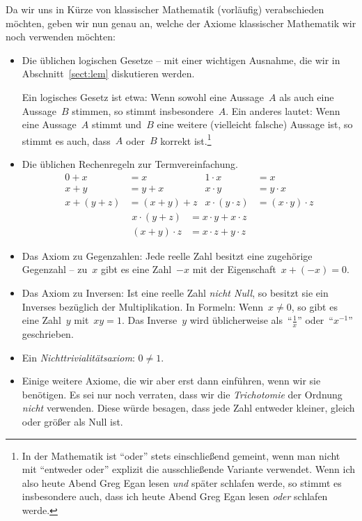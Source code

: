 \documentclass[twoside]{../zirkelblatt}
\theoremstyle{definition}
\theoremstyle{plain}
\theoremstyle{remark}
\begin{document}
Da wir uns in Kürze von klassischer Mathematik (vorläufig) verabschieden
möchten, geben wir nun genau an, welche der Axiome klassischer Mathematik wir
noch verwenden möchten:
\begin{itemize}
\item Die üblichen logischen Gesetze -- mit einer wichtigen Ausnahme, die wir
in Abschnitt~\ref{sect:lem} diskutieren werden.

Ein logisches Gesetz ist etwa: Wenn sowohl eine Aussage~$A$
als auch eine Aussage~$B$ stimmen, so stimmt insbesondere~$A$. Ein anderes
lautet: Wenn eine Aussage~$A$ stimmt und~$B$ eine weitere (vielleicht falsche)
Aussage ist, so stimmt es auch, dass~$A$ oder~$B$ korrekt ist.\footnote{In der
Mathematik ist "`oder"' stets einschließend gemeint, wenn man nicht mit
"`entweder oder"' explizit die ausschließende Variante verwendet. Wenn ich
also heute Abend Greg Egan lesen \emph{und} später schlafen werde, so stimmt es
insbesondere auch, dass ich heute Abend Greg Egan lesen \emph{oder} schlafen
werde.}
\item Die üblichen Rechenregeln zur Termvereinfachung.
\begin{align*}
  0 + x &= x &
  1 \cdot x &= x \\
  x + y &= y + x &
  x \cdot y &= y \cdot x \\
  x + (y + z) &= (x + y) + z &
  x \cdot (y \cdot z) &= (x \cdot y) \cdot z
\end{align*}
\begin{align*}
  x \cdot (y + z) &= x \cdot y + x \cdot z \\
  (x + y) \cdot z &= x \cdot z + y \cdot z
\end{align*}
\item Das Axiom zu Gegenzahlen: Jede reelle Zahl besitzt eine zugehörige
Gegenzahl -- zu~$x$ gibt es eine Zahl~$-x$ mit der Eigenschaft~$x + (-x) = 0$.
\item \label{ax:nichtnullinv}Das Axiom zu Inversen: Ist eine reelle Zahl \emph{nicht Null}, so besitzt
sie ein Inverses bezüglich der Multiplikation. In Formeln: Wenn~$x \neq 0$, so
gibt es eine Zahl~$y$ mit~$xy = 1$. Das Inverse~$y$ wird üblicherweise
als~"`$\frac{1}{x}$"' oder~"`$x^{-1}$"' geschrieben.
\item Ein \emph{Nichttrivialitätsaxiom}: $0 \neq 1$.
\item Einige weitere Axiome, die wir aber erst dann einführen, wenn wir sie
benötigen. Es sei nur noch verraten, dass wir die \emph{Trichotomie} der Ordnung
\emph{nicht} verwenden. Diese würde besagen, dass jede Zahl entweder kleiner,
gleich oder größer als Null ist.
\end{itemize}
\end{document}
